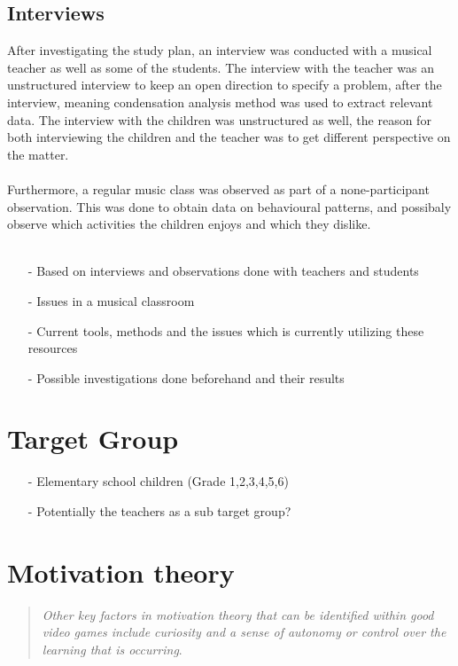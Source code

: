 	\subsection{Interviews}
	After investigating the study plan, an interview was conducted with a musical teacher as well as some of the students. The interview with the teacher was an unstructured interview to keep an open direction to specify a problem, after the interview, meaning condensation analysis method was used to extract relevant data. The interview with the children was unstructured as well, the reason for both interviewing the children and the teacher was to get different perspective on the matter. 
	\\\\
	Furthermore, a regular music class was observed as part of a none-participant observation. This was done to obtain data on behavioural patterns, and possibaly observe which activities the children enjoys and which they dislike. 
	\\\\
	\begin{itemize}
	\item[-] Based on interviews and observations done with teachers and students
	\item[-] Issues in a musical classroom
	\item[-] Current tools, methods and the issues which is currently utilizing these resources
	\item[-] Possible investigations done beforehand and their results	
\end{itemize}

\section{Target Group}

\begin{itemize}
	\item[-] Elementary school children (Grade 1,2,3,4,5,6)
	\item[-] Potentially the teachers as a sub target group?
\end{itemize}

\section{Motivation theory}
\begin{quote}
	\textit{Other key factors in motivation theory that can be identified within good video games include curiosity and a sense of autonomy or control over the learning that is occurring}\cite[p.~92]{interactiveMusicVideoGames}.\\
\end{quote}
